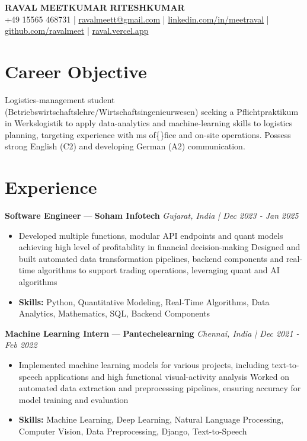 \documentclass[a4paper,10pt]{article}
\begin{document}
\begin{center}
  {\Large\bfseries RAVAL MEETKUMAR RITESHKUMAR}\\[2pt]
  {\small +49 15565 468731 \;|\; \href{mailto:ravalmeett@gmail.com}{ravalmeett@gmail.com} \;|\; \href{https://www.linkedin.com/in/meetraval/}{linkedin.com/in/meetraval} \;|\; \href{https://github.com/ravalmeet}{github.com/ravalmeet} \;|\; \href{https://raval.vercel.app/}{raval.vercel.app}}
\end{center}
\vspace{-3pt}

\section*{Career Objective}
Logistics-management student (Betriebswirtschaftslehre/Wirtschaftsingenieurwesen) seeking a Pflichtpraktikum in Werkslogistik to apply data-analytics and machine-learning skills to logistics planning, targeting experience with ms of\{\}fice and on-site operations. Possess strong English (C2) and developing German (A2) communication.\par

\section*{Experience}
\textbf{Software Engineer} — \textbf{Soham Infotech} \hfill \textit{Gujarat, India \;|\; Dec 2023 - Jan 2025}\par
\vspace{1pt}
\begin{itemize}
  \item Developed multiple functions, modular API endpoints and quant models achieving high level of profitability in financial decision-making Designed and built automated data transformation pipelines, backend components and real-time algorithms to support trading operations, leveraging quant and AI algorithms
  \item \textbf{Skills:} Python, Quantitative Modeling, Real-Time Algorithms, Data Analytics, Mathematics, SQL, Backend Components
\end{itemize}
\vspace{3pt}
\textbf{Machine Learning Intern} — \textbf{Pantechelearning} \hfill \textit{Chennai, India \;|\; Dec 2021 - Feb 2022}\par
\vspace{1pt}
\begin{itemize}
  \item Implemented machine learning models for various projects, including text-to-speech applications and high functional visual-activity analysis Worked on automated data extraction and preprocessing pipelines, ensuring accuracy for model training and evaluation
  \item \textbf{Skills:} Machine Learning, Deep Learning, Natural Language Processing, Computer Vision, Data Preprocessing, Django, Text-to-Speech
\end{itemize}
\end{document}
